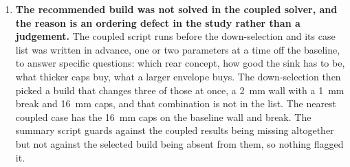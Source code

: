 \documentclass[11pt,a4paper]{article}
\begin{document}
\begin{enumerate}[itemsep=4pt]
  \item \textbf{The recommended build was not solved in the coupled solver,
        and the reason is an ordering defect in the study rather than a
        judgement.} The coupled script runs before the down-selection and its
        case list was written in advance, one or two parameters at a time off
        the baseline, to answer specific questions: which rear concept, how
        good the sink has to be, what thicker caps buy, what a larger envelope
        buys. The down-selection then picked a build that changes three of
        those at once, a 2~mm wall with a 1~mm break and 16~mm caps, and that
        combination is not in the list. The nearest coupled case has the 16~mm
        caps on the baseline wall and break. The summary script guards against
        the coupled results being missing altogether but not against the
        selected build being absent from them, so nothing flagged it.


\end{enumerate}
\end{document}
